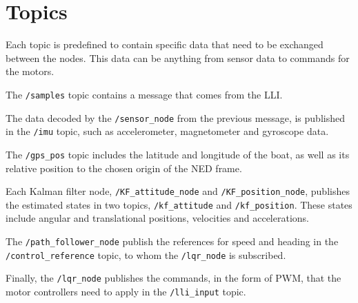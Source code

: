 \section{Topics}
Each topic is predefined to contain specific data that need to be exchanged between the nodes. This data can be anything from sensor data to commands for the motors.

The \lstinline[style=cinline]{/samples} topic contains a message that comes from the LLI.

The data decoded by the \lstinline[style=cinline]{/sensor_node} from the previous message, is published in the \lstinline[style=cinline]{/imu} topic, such as accelerometer, magnetometer and gyroscope data.

The \lstinline[style=cinline]{/gps_pos} topic includes the latitude and longitude of the boat, as well as its relative position to the chosen origin of the NED frame.

Each Kalman filter node, \lstinline[style=cinline]{/KF_attitude_node} and \lstinline[style=cinline]{/KF_position_node}, publishes the estimated states in two topics, \lstinline[style=cinline]{/kf_attitude} and \lstinline[style=cinline]{/kf_position}. These states include angular and translational positions, velocities and accelerations.

The \lstinline[style=cinline]{/path_follower_node} publish the references for speed and heading in the \lstinline[style=cinline]{/control_reference} topic, to whom the \lstinline[style=cinline]{/lqr_node} is subscribed.

Finally, the \lstinline[style=cinline]{/lqr_node} publishes the commands, in the form of PWM, that the motor controllers need to apply in the \lstinline[style=cinline]{/lli_input} topic.

